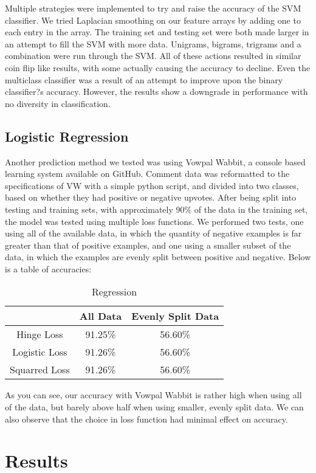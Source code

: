 \documentclass{article}
\begin{document}
Multiple strategies were implemented to try and raise the accuracy of the SVM classifier. We tried Laplacian smoothing on our feature arrays by adding one to each entry in the array. The training set and testing set were both made larger in an attempt to fill the SVM with more data. Unigrams, bigrams, trigrams and a combination were run through the SVM. All of these actions resulted in similar coin flip like results, with some actually causing the accuracy to decline. Even the multiclass classifier was a result of an attempt to improve upon the binary classifier?s accuracy. However, the results show a downgrade in performance with no diversity in classification.

\subsection{Logistic Regression}
Another prediction method we tested was using Vowpal Wabbit, a console based learning system available on GitHub. Comment data was reformatted to the specifications of VW with a simple python script, and divided into two classes, based on whether they had positive or negative upvotes. After being split into testing and training sets, with approximately 90\% of the data in the training set, the model was tested using multiple loss functions. We performed two tests, one using all of the available data, in which the quantity of negative examples is far greater than that of positive examples, and one using a smaller subset of the data, in which the examples are evenly split between positive and negative. Below is a table of accuracies:


\begin{table}[h]
\centering
\caption{Regression}
\begin{tabular}{|| c c c||}
\hline
& All Data & Evenly Split Data\\
\hline\hline
Hinge Loss & 91.25\% & 56.60\% \\
Logistic Loss & 91.26\% & 56.60\% \\
Squarred Loss & 91.26\% & 56.60\% \\
\hline
\end{tabular}
\end{table}

As you can see, our accuracy with Vowpal Wabbit is rather high when using all of the data, but barely above half when using smaller, evenly split data. We can also observe that the choice in loss function had minimal effect on accuracy.

\section{Results}
\end{document}
